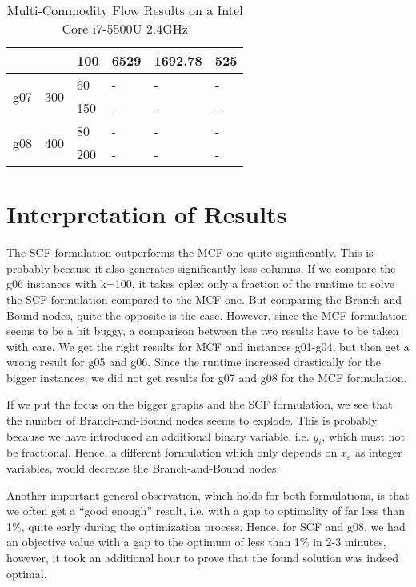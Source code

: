 \documentclass{article}
\begin{document}
\begin{table}[h!]
\begin{tabular}{l|l|l|l|l|l}
							&                   	& 100        	& 6529               & 1692.78                     & 525                                      \\ \hline
		\multirow{2}{*}{g07}& \multirow{2}{*}{300} 	& 60         	& -                  & -                           & -                                        \\
							&                   	& 150        	& -                  & -                           & -                                        \\ \hline
		\multirow{2}{*}{g08}& \multirow{2}{*}{400} 	& 80         	& -                  & -                           & -                                        \\
							&                   	& 200        	& -                  & -                           & -                                       
	\end{tabular}
	\caption{Multi-Commodity Flow Results on a Intel Core i7-5500U 2.4GHz}
\end{table}

\section{Interpretation of Results}
The SCF formulation outperforms the MCF one quite significantly. This is probably because it also generates significantly less columns. If we compare the g06 instances with k=100, it takes cplex only a fraction of the runtime to solve the SCF formulation compared to the MCF one. But comparing the Branch-and-Bound nodes, quite the opposite is the case. However, since the MCF formulation seems to be a bit buggy, a comparison between the two results have to be taken with care. We get the right results for MCF and instances g01-g04, but then get a wrong result for g05 and g06. Since the runtime increased drastically for the bigger instances, we did not get results for g07 and g08 for the MCF formulation.

If we put the focus on the bigger graphs and the SCF formulation, we see that the number of Branch-and-Bound nodes seems to explode. This is probably because we have introduced an additional binary variable, i.e. $y_i$, which must not be fractional. Hence, a different formulation which only depends on $x_e$ as integer variables, would decrease the Branch-and-Bound nodes.

Another important general observation, which holds for both formulations, is that we often get a ``good enough'' result, i.e. with a gap to optimality of far less than 1\%, quite early during the optimization process. Hence, for SCF and g08, we had an objective value with a gap to the optimum of less than 1\% in 2-3 minutes, however, it took an additional hour to prove that the found solution was indeed optimal.
\end{document}
